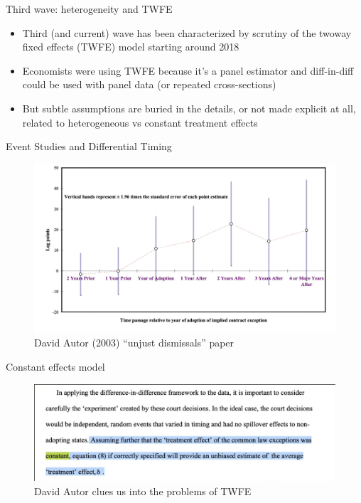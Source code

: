 \documentclass{beamer}
\begin{document}
\begin{frame}{Third wave: heterogeneity and TWFE}

\begin{itemize}

\item Third (and current) wave has been characterized by scrutiny of the twoway fixed effects (TWFE) model starting around 2018
\item Economists were using TWFE because it's a panel estimator and diff-in-diff could be used with panel data (or repeated cross-sections)
\item But subtle assumptions are buried in the details, or not made explicit at all, related to heterogeneous vs constant treatment effects


\end{itemize}

\end{frame}



\begin{frame}{Event Studies and Differential Timing}

	\begin{figure}
	\includegraphics[scale=0.35]{./lecture_includes/autor2003}
	\caption{David Autor (2003) ``unjust dismissals'' paper}
	\end{figure}

\end{frame}

\begin{frame}{Constant effects model}

	\begin{figure}
	\includegraphics[scale=0.25]{./lecture_includes/autor_quote}
	\caption{David Autor clues us into the problems of TWFE}
	\end{figure}

\end{frame}
\end{document}
